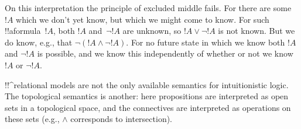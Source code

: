 \documentclass[../../../include/open-logic-section]{subfiles}
\begin{document}
On this interpretation the principle of excluded middle fails. For
there are some $!A$ which we don't yet know, but which we might come
to know. For such !!a{formula}~$!A$, both $!A$ and~$\lnot !A$ are unknown, so
$!A \lor \lnot !A$ is not known. But we do know, e.g., that $\lnot(!A
\land \lnot !A)$. For no future state in which we know both $!A$ and
$\lnot !A$ is possible, and we know this independently of whether or
not we know~$!A$ or $\lnot !A$.

!!^{relational model}s are not the only available semantics for
intuitionistic logic. The topological semantics is another: here
propositions are interpreted as open sets in a topological space, and
the connectives are interpreted as operations on these sets (e.g.,
$\land$ corresponds to intersection).
\end{document}

